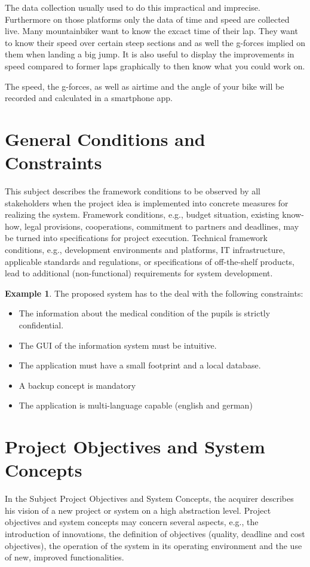 \documentclass[12pt]{article}
\theoremstyle{definition}
\newtheorem{example}{Example}
\newenvironment{explanation}{%
   \setlength{\parindent}{0pt}
   \itshape
   \color{blue}
}{}
\begin{document}
The data collection usually used to do this impractical and imprecise. Furthermore on those platforms only the data of time and speed are collected live. Many mountainbiker want to know the excact time of their lap. They want to know their speed over certain steep sections and as well the g-forces implied on them when landing a big jump. It is also useful to display the improvements in speed compared to former laps graphically to then know what you could work on. 

The speed, the g-forces, as well as airtime and the angle of your bike will be recorded and calculated in a smartphone app.
\pagebreak

\section{General Conditions and Constraints}
\begin{explanation}
This subject describes the framework conditions to be observed by all stakeholders when the project idea is implemented into concrete measures for realizing the system. Framework conditions, e.g., budget situation, existing know-how, legal provisions, cooperations, commitment to partners and deadlines, may be turned into specifications for project execution.
Technical framework conditions, e.g., development environments and platforms, IT infrastructure, applicable standards and regulations, or specifications of off-the-shelf products, lead to additional (non-functional) requirements for system development.
\end{explanation}

\begin{example}
The proposed system has to the deal with the following constraints:
\begin{itemize}
\item The information about the medical condition of the pupils is strictly confidential.
\item The GUI of the information system must be intuitive.
\item The application must have a small footprint and a local database.
\item A backup concept is mandatory
\item The application is multi-language capable (english and german)
\end{itemize}
\end{example}
\pagebreak

\section{Project Objectives and System Concepts}
\begin{explanation}
In the Subject Project Objectives and System Concepts, the acquirer describes his vision of a new project or system on a high abstraction level. Project objectives and system concepts may concern several aspects, e.g., the introduction of innovations, the definition of objectives (quality, deadline and cost objectives), the operation of the system in its operating environment and the use of new, improved functionalities.
\end{explanation}
\end{document}
